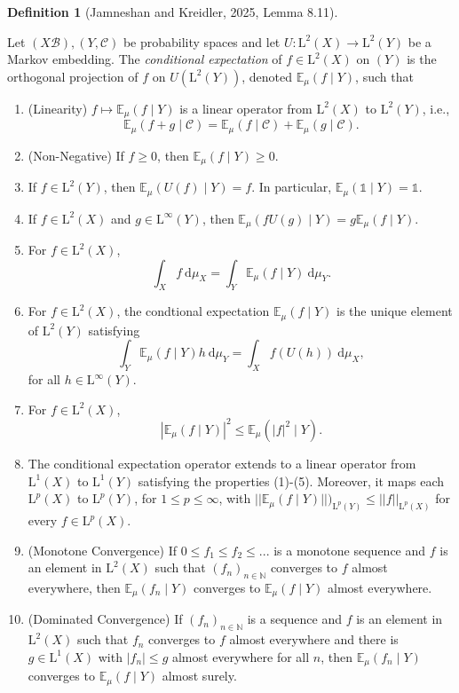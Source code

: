 \documentclass[
  british,
]{article}
\providecommand{\tightlist}{%
  \setlength{\itemsep}{0pt}\setlength{\parskip}{0pt}}
\theoremstyle{plain}
\theoremstyle{definition}
\newtheorem{definition}{Definition}[section]
\theoremstyle{remark}
\newcommand{\Measure}{{\mu}}
\newcommand{\SigmaAlgebra}[1]{{\mathscr{#1}}}
\newcommand{\Expectation}[1][\Measure]{{\mathbb{E}}_{#1}}
\begin{document}
\begin{definition}[{Jamneshan and Kreidler, 2025, Lemma
8.11}]\protect\hypertarget{def-ConditionalExpectation}{}\label{def-ConditionalExpectation}

Let \((X\SigmaAlgebra{B}),(Y,\SigmaAlgebra{C})\) be probability spaces
and let \(U:\text{L}^2(X)\rightarrow\text{L}^2(Y)\) be a Markov
embedding. The \emph{conditional expectation} of \(f\in\text{L}^2(X)\)
on \((Y)\) is the orthogonal projection of \(f\) on
\(U(\text{L}^2(Y))\), denoted \(\Expectation(f\mid Y)\), such that

\begin{enumerate}
\def\labelenumi{\arabic{enumi}.}
\tightlist
\item
  (Linearity) \(f\mapsto\Expectation(f\mid Y)\) is a linear operator
  from \(\text{L}^2(X)\) to \(\text{L}^2(Y)\), i.e.,
  \[\Expectation(f+g\mid\SigmaAlgebra{C})=\Expectation(f\mid\SigmaAlgebra{C})+\Expectation(g\mid\SigmaAlgebra{C}).\]
\item
  (Non-Negative) If \(f\geq0\), then \(\Expectation(f\mid Y)\geq0\).
\item
  If \(f\in \text{L}^2(Y)\), then \(\Expectation(U(f)\mid Y)=f\). In
  particular, \(\Expectation(\mathbb{1}\mid Y)=\mathbb{1}\).
\item
  If \(f\in\text{L}^2(X)\) and \(g\in\text{L}^\infty(Y)\), then
  \(\Expectation(fU(g)\mid Y)=g\Expectation(f\mid Y)\).
\item
  For \(f\in\text{L}^2(X)\),
  \[\int_X f\ \mathrm{d}\Measure_X=\int_Y\Expectation(f\mid Y)\ \mathrm{d}\Measure_Y. \]
\item
  For \(f\in\text{L}^2(X)\), the condtional expectation
  \(\Expectation(f\mid Y)\) is the unique element of \(\text{L}^2(Y)\)
  satisfying
  \[\int_Y\Expectation(f\mid Y)h\ \mathrm{d}\Measure_Y=\int_Xf(U(h))\ \mathrm{d}\Measure_X, \]for
  all \(h\in\text{L}^\infty(Y)\).
\item
  For \(f\in\text{L}^2(X)\),
  \[|\Expectation(f\mid Y)|^2\leq\Expectation(|f|^2\mid Y). \]
\item
  The conditional expectation operator extends to a linear operator from
  \(\text{L}^1(X)\) to \(\text{L}^1(Y)\) satisfying the properties
  (1)-(5). Moreover, it maps each \(\text{L}^p(X)\) to
  \(\text{L}^p(Y)\), for \(1\leq p\leq\infty\), with
  \(||\Expectation(f\mid Y)||)_{\text{L}^p(Y)}\leq||f||_{\text{L}^p(X)}\)
  for every \(f\in\text{L}^p(X)\).
\item
  (Monotone Convergence) If \(0\leq f_1\leq f_2\leq...\) is a monotone
  sequence and \(f\) is an element in \(\text{L}^2(X)\) such that
  \((f_n)_{n\in\mathbb{N}}\) converges to \(f\) almost everywhere, then
  \(\Expectation(f_n\mid Y)\) converges to \(\Expectation(f\mid Y)\)
  almost everywhere.
\item
  (Dominated Convergence) If \((f_n)_{n\in\mathbb{N}}\) is a sequence
  and \(f\) is an element in \(\text{L}^2(X)\) such that \(f_n\)
  converges to \(f\) almost everywhere and there is
  \(g\in\text{L}^1(X)\) with \(|f_n|\leq g\) almost everywhere for all
  \(n\), then \(\Expectation(f_n\mid Y)\) converges to
  \(\Expectation(f\mid Y)\) almost surely.
\end{enumerate}


\end{definition}
\end{document}
